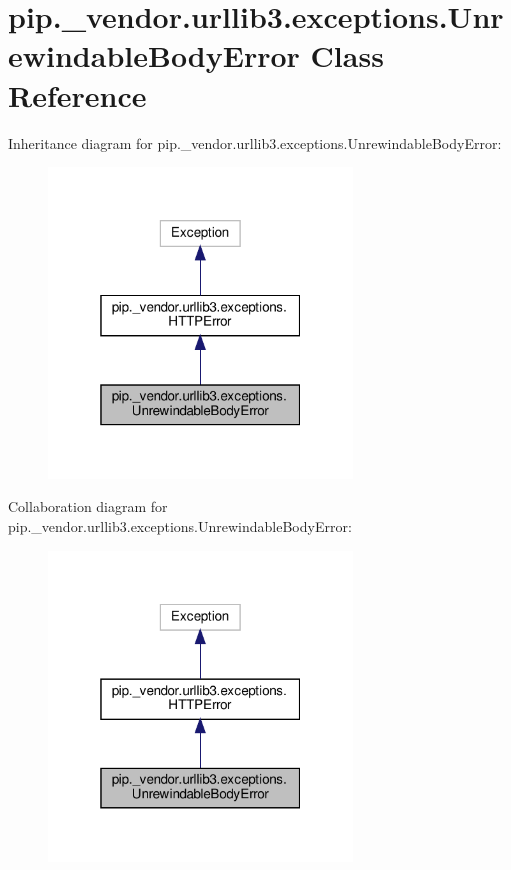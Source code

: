 \hypertarget{classpip_1_1__vendor_1_1urllib3_1_1exceptions_1_1UnrewindableBodyError}{}\section{pip.\+\_\+vendor.\+urllib3.\+exceptions.\+Unrewindable\+Body\+Error Class Reference}
\label{classpip_1_1__vendor_1_1urllib3_1_1exceptions_1_1UnrewindableBodyError}


Inheritance diagram for pip.\+\_\+vendor.\+urllib3.\+exceptions.\+Unrewindable\+Body\+Error\+:
\nopagebreak
\begin{figure}[H]
\begin{center}
\leavevmode
\includegraphics[width=229pt]{classpip_1_1__vendor_1_1urllib3_1_1exceptions_1_1UnrewindableBodyError__inherit__graph}
\end{center}
\end{figure}


Collaboration diagram for pip.\+\_\+vendor.\+urllib3.\+exceptions.\+Unrewindable\+Body\+Error\+:
\nopagebreak
\begin{figure}[H]
\begin{center}
\leavevmode
\includegraphics[width=229pt]{classpip_1_1__vendor_1_1urllib3_1_1exceptions_1_1UnrewindableBodyError__coll__graph}
\end{center}
\end{figure}


